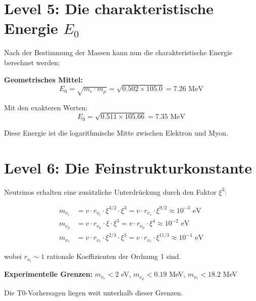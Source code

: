 \documentclass[12pt,a4paper]{article}
\newcommand{\xipar}{\xi}
\newcommand{\Ezero}{E_0}
\begin{document}
	\section{Level 5: Die charakteristische Energie $E_0$}
	
	\begin{derived}
		Nach der Bestimmung der Massen kann nun die charakteristische Energie berechnet werden:
		
		\textbf{Geometrisches Mittel:}
		\begin{equation}
			\Ezero = \sqrt{m_e \cdot m_\mu} = \sqrt{0.502 \times 105.0} = 7.26 \text{ MeV}
		\end{equation}
		
		Mit den exakteren Werten:
		\begin{equation}
			\Ezero = \sqrt{0.511 \times 105.66} = 7.35 \text{ MeV}
		\end{equation}
		
		Diese Energie ist die logarithmische Mitte zwischen Elektron und Myon.
	\end{derived}
	
	\section{Level 6: Die Feinstrukturkonstante}
	
	\begin{derived}
		Neutrinos erhalten eine zusätzliche Unterdrückung durch den Faktor $\xipar^3$:
		
		\begin{align}
			m_{\nu_e} &= v \cdot r_{\nu_e} \cdot \xipar^{3/2} \cdot \xipar^3 = v \cdot r_{\nu_e} \cdot \xipar^{9/2} \approx 10^{-3} \text{ eV} \\
			m_{\nu_\mu} &= v \cdot r_{\nu_\mu} \cdot \xipar \cdot \xipar^3 = v \cdot r_{\nu_\mu} \cdot \xipar^{4} \approx 10^{-2} \text{ eV} \\
			m_{\nu_\tau} &= v \cdot r_{\nu_\tau} \cdot \xipar^{2/3} \cdot \xipar^3 = v \cdot r_{\nu_\tau} \cdot \xipar^{11/3} \approx 10^{-1} \text{ eV}
		\end{align}
		
		wobei $r_{\nu_i} \sim 1$ rationale Koeffizienten der Ordnung 1 sind.
		
		\textbf{Experimentelle Grenzen:} $m_{\nu_e} < 2$ eV, $m_{\nu_\mu} < 0.19$ MeV, $m_{\nu_\tau} < 18.2$ MeV
		
		Die T0-Vorhersagen liegen weit unterhalb dieser Grenzen.
	\end{derived}
	
\end{document}
